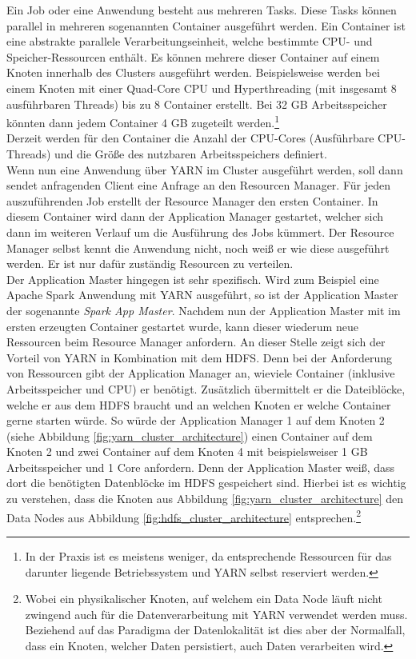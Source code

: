 \noindent
Ein Job oder eine Anwendung besteht aus mehreren Tasks. Diese Tasks können parallel in mehreren sogenannten Container ausgeführt werden. Ein Container ist eine abstrakte parallele Verarbeitungseinheit, welche bestimmte CPU- und Speicher-Ressourcen enthält. Es können mehrere dieser Container auf einem Knoten innerhalb des Clusters ausgeführt werden. Beispielsweise werden bei einem Knoten mit einer Quad-Core CPU und Hyperthreading (mit insgesamt 8 ausführbaren Threads) bis zu 8 Container erstellt. Bei 32 GB Arbeitsspeicher könnten dann jedem Container 4 GB zugeteilt werden.\footnote{In der Praxis ist es meistens weniger, da entsprechende Ressourcen für das darunter liegende Betriebssystem und YARN selbst reserviert werden.}\\
Derzeit werden für den Container die Anzahl der CPU-Cores (Ausführbare CPU-Threads) und die Größe des nutzbaren Arbeitsspeichers definiert.\cite[S. 48 ff.]{expert_hadoop_admin}\\

\noindent
Wenn nun eine Anwendung über YARN im Cluster ausgeführt werden, soll dann sendet anfragenden Client eine Anfrage an den Resourcen Manager. 
Für jeden auszuführenden Job erstellt der Resource Manager den ersten Container. In diesem Container wird dann der Application Manager gestartet, welcher sich dann im weiteren Verlauf um die Ausführung des Jobs kümmert. Der Resource Manager selbst kennt die Anwendung nicht, noch weiß er wie diese ausgeführt werden. 
Er ist nur dafür zuständig Resourcen zu verteilen.\\ 
Der Application Master hingegen ist sehr spezifisch. Wird zum Beispiel eine Apache Spark Anwendung mit YARN ausgeführt, so ist der Application Master der sogenannte \textit{Spark App Master}. Nachdem nun der Application Master mit im ersten erzeugten Container gestartet wurde, kann dieser wiederum neue Ressourcen beim Resource Manager anfordern. An dieser Stelle zeigt sich der Vorteil von YARN in Kombination mit dem HDFS. Denn bei der Anforderung von Ressourcen gibt der Application Manager an, wieviele Container (inklusive Arbeitsspeicher und CPU) er benötigt. Zusätzlich übermittelt er die Dateiblöcke, welche er aus dem HDFS braucht und an welchen Knoten er welche Container gerne starten würde. So würde der Application Manager 1 auf dem Knoten 2 (siehe Abbildung \ref{fig:yarn_cluster_architecture}) einen Container auf dem Knoten 2 und zwei Container auf dem Knoten 4 mit beispielsweiser 1 GB Arbeitsspeicher und 1 Core anfordern. Denn der Application Master weiß, dass dort die benötigten Datenblöcke im HDFS gespeichert sind. Hierbei ist es wichtig zu verstehen, dass die Knoten aus Abbildung \ref{fig:yarn_cluster_architecture} den Data Nodes aus Abbildung \ref{fig:hdfs_cluster_architecture} entsprechen.\footnote{Wobei ein physikalischer Knoten, auf welchem ein Data Node läuft nicht zwingend auch für die Datenverarbeitung mit YARN verwendet werden muss. Beziehend auf das Paradigma der Datenlokalität ist dies aber der Normalfall, dass ein Knoten, welcher Daten persistiert, auch Daten verarbeiten wird.}\\

